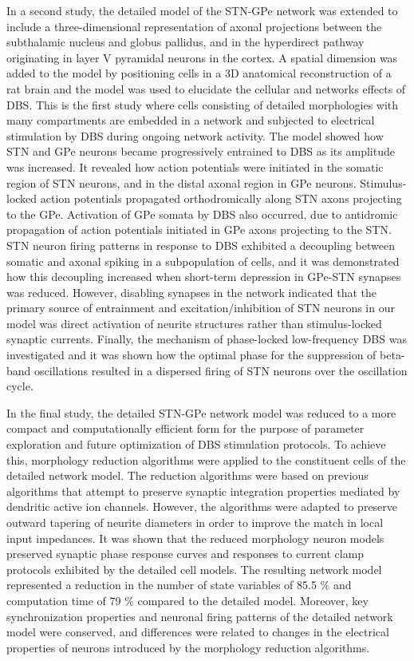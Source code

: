 %
In a second study, the detailed model of the STN-GPe network was extended to include a
three-dimensional representation of axonal projections between the subthalamic nucleus and
globus pallidus, and in the hyperdirect pathway originating in layer V pyramidal neurons
in the cortex. A spatial dimension was added to the model by positioning cells in a 3D
anatomical reconstruction of a rat brain and the model was used to elucidate the cellular
and networks effects of DBS. This is the first study where cells consisting of detailed
morphologies with many compartments are embedded in a network and subjected to electrical
stimulation by DBS during ongoing network activity.
%
The model showed how STN and GPe neurons became progressively entrained
to DBS as its amplitude was increased. It revealed
how action potentials were initiated in the somatic region of STN neurons, and in the
distal axonal region in GPe neurons. Stimulus-locked action potentials propagated 
orthodromically along STN axons projecting to the GPe. Activation of GPe somata by DBS
also occurred, due to antidromic propagation of action potentials initiated in GPe axons
projecting to the STN. STN neuron firing patterns in response to DBS exhibited a
decoupling between somatic and axonal spiking in a subpopulation of cells, and it was
demonstrated how this decoupling increased when short-term depression in GPe-STN synapses
was reduced. However, disabling synapses in the network indicated that the primary source
of entrainment and excitation/inhibition of STN neurons in our model was direct activation
of neurite structures rather than stimulus-locked synaptic currents.
Finally, the mechanism of phase-locked low-frequency DBS was investigated and
it was shown how the optimal phase for the suppression of beta-band oscillations resulted
in a dispersed firing of STN neurons over the oscillation cycle.

%
In the final study, the detailed STN-GPe network model was reduced to a more compact and
computationally efficient form for the purpose of parameter exploration and future
optimization of DBS stimulation protocols. To achieve this, morphology reduction algorithms
were applied to the constituent cells of the detailed network model. The reduction
algorithms were based on previous algorithms that attempt to preserve synaptic integration
properties mediated by dendritic active ion channels. However, the algorithms were
adapted to preserve outward tapering of neurite diameters in order to improve the
match in local input impedances.
%
It was shown that the reduced morphology neuron models preserved synaptic phase response
curves and responses to current clamp protocols exhibited by the detailed cell models.
The resulting network model
represented a reduction in the number of state variables of 85.5 \% and computation time of
79 \% compared to the detailed model. Moreover, key synchronization properties and neuronal
firing patterns of the detailed network model were conserved, and differences were related
to changes in the electrical properties of neurons introduced by the morphology reduction
algorithms.


